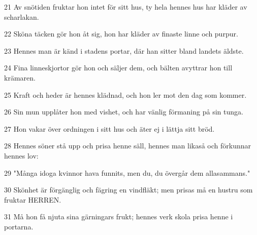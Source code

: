 \par 21 Av snötiden fruktar hon intet för sitt hus, ty hela hennes hus har kläder av scharlakan.
\par 22 Sköna täcken gör hon åt sig, hon har kläder av finaste linne och purpur.
\par 23 Hennes man är känd i stadens portar, där han sitter bland landets äldste.
\par 24 Fina linneskjortor gör hon och säljer dem, och bälten avyttrar hon till krämaren.
\par 25 Kraft och heder är hennes klädnad, och hon ler mot den dag som kommer.
\par 26 Sin mun upplåter hon med vishet, och har vänlig förmaning på sin tunga.
\par 27 Hon vakar över ordningen i sitt hus och äter ej i lättja sitt bröd.
\par 28 Hennes söner stå upp och prisa henne säll, hennes man likaså och förkunnar hennes lov:
\par 29 "Många idoga kvinnor hava funnits, men du, du övergår dem allasammans."
\par 30 Skönhet är förgänglig och fägring en vindfläkt; men prisas må en hustru som fruktar HERREN.
\par 31 Må hon få njuta sina gärningars frukt; hennes verk skola prisa henne i portarna.


